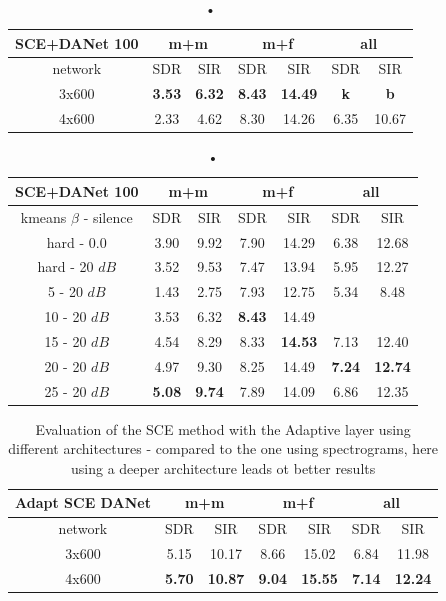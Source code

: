 \documentclass[master, tikz, final,11pt, dvipdfmx]{iscs-thesis}
\begin{document}
\begin{table}[h]
\centering
\begin{tabular}{c|c|c|c|c|c|c}
SCE+DANet 100 & \multicolumn{2}{c|}{m+m} & \multicolumn{2}{c|}{m+f} & \multicolumn{2}{c}{all} \\ 
\hline 
network & SDR & SIR & SDR & SIR & SDR & SIR \\ 
\hline 
3x600 & \textbf{3.53} & \textbf{6.32} & \textbf{8.43} & \textbf{14.49} & \textbf{k} & \textbf{b} \\ 
4x600 & 2.33 & 4.62 & 8.30 & 14.26 & 6.35 & 10.67 \\  
\end{tabular}
\captionsetup{justification=centering}
\caption{•}
\label{table:SCE100DANETarch}
\end{table}


\begin{table}[h]
\centering
\begin{tabular}{c|c|c|c|c|c|c}
SCE+DANet 100 & \multicolumn{2}{c|}{m+m} & \multicolumn{2}{c|}{m+f} & \multicolumn{2}{c}{all} \\ 
\hline 
kmeans $\beta$ - silence & SDR & SIR & SDR & SIR & SDR & SIR \\ 
\hline
hard - 0.0  & 3.90 & 9.92 & 7.90 & 14.29 & 6.38 & 12.68 \\ 
hard - 20 $dB$  & 3.52 & 9.53 & 7.47 & 13.94 & 5.95 & 12.27 \\
\hline
\hline
5 - 20 $dB$  & 1.43 & 2.75 & 7.93 & 12.75 & 5.34 & 8.48 \\ 
10 - 20 $dB$  & 3.53 & 6.32 & \textbf{8.43} & 14.49 &  &  \\ 
15 - 20 $dB$ & 4.54 & 8.29 & 8.33 & \textbf{14.53} & 7.13 & 12.40 \\ 
20 - 20 $dB$ & 4.97 & 9.30 & 8.25 & 14.49 & \textbf{7.24} & \textbf{12.74} \\ 
25 - 20 $dB$ & \textbf{5.08} & \textbf{9.74} & 7.89 & 14.09 & 6.86 & 12.35 \\ 
\end{tabular}
\captionsetup{justification=centering}
\caption{•}
\label{table:SCE100DANET}
\end{table}

\begin{table}[h]
\centering
\begin{tabular}{c|c|c|c|c|c|c}
Adapt SCE DANet & \multicolumn{2}{c|}{m+m} & \multicolumn{2}{c|}{m+f} & \multicolumn{2}{c}{all} \\ 
\hline 
network & SDR & SIR & SDR & SIR & SDR & SIR \\ 
\hline 
3x600 & 5.15 & 10.17 & 8.66 & 15.02 & 6.84 & 11.98 \\ 
4x600 & \textbf{5.70} & \textbf{10.87} & \textbf{9.04} & \textbf{15.55} & \textbf{7.14} & \textbf{12.24} \\  
\end{tabular}
\caption{Evaluation of the SCE method with the Adaptive layer using different architectures - compared to the one using spectrograms, here using a deeper architecture leads ot better results}
\label{table:AdaptSCEDANETarch}
\end{table}
\end{document}
